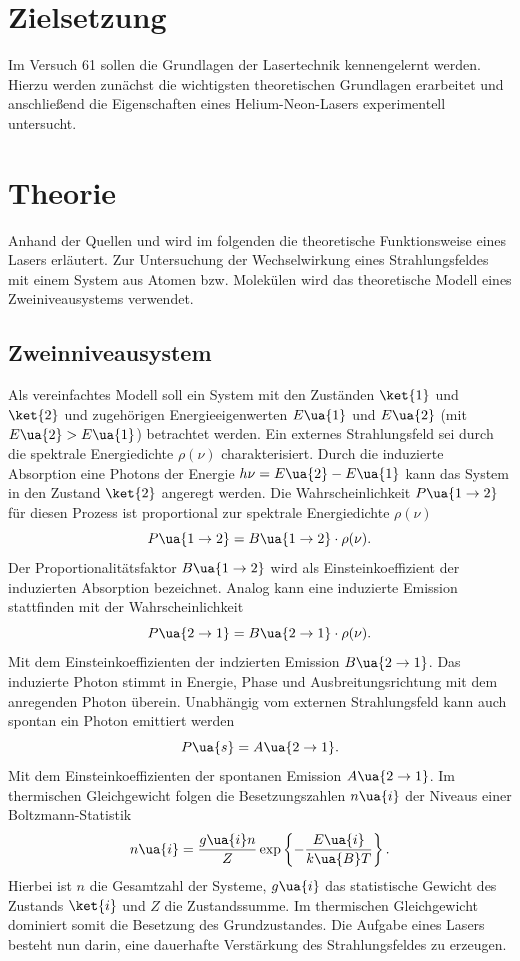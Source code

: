 \setcounter{page}{1}
\section*{Zielsetzung}
Im Versuch 61 sollen die Grundlagen der Lasertechnik kennengelernt werden. Hierzu werden zunächst die
wichtigsten theoretischen Grundlagen erarbeitet und anschließend die Eigenschaften eines Helium-Neon-Lasers
experimentell untersucht.
\section{Theorie}
Anhand der Quellen \cite{anleitung61} und \cite{dem} wird im folgenden die theoretische Funktionsweise eines Lasers
erläutert. Zur Untersuchung der Wechselwirkung eines Strahlungsfeldes mit einem System aus Atomen bzw. Molekülen
wird das theoretische Modell eines Zweiniveausystems verwendet.
\subsection{Zweinniveausystem}
Als vereinfachtes Modell soll ein System mit den Zuständen $\ket{1}$ und $\ket{2}$ und zugehörigen Energieeigenwerten
$E\ua{1}$ und $E\ua{2}$ (mit $E\ua{2}> E\ua{1}$) betrachtet werden. Ein externes Strahlungsfeld sei durch die spektrale Energiedichte $\rho(\nu)$
charakterisiert. Durch die induzierte Absorption eine Photons der Energie $h \nu = E\ua{2} - E\ua{1}$ kann das
System in den Zustand $\ket{2}$ angeregt werden. Die Wahrscheinlichkeit $P\ua{1\rightarrow 2}$ für diesen Prozess ist proportional
zur spektrale Energiedichte $\rho(\nu)$
\begin{equation}
  P\ua{1\rightarrow 2} = B\ua{1\rightarrow 2}\cdot\rho(\nu).
\end{equation}
Der Proportionalitätsfaktor $B\ua{1\rightarrow 2}$ wird als Einsteinkoeffizient der induzierten Absorption bezeichnet. Analog kann
eine induzierte Emission stattfinden mit der Wahrscheinlichkeit
\begin{equation}
  P\ua{2\rightarrow 1} = B\ua{2\rightarrow 1}\cdot\rho(\nu).
\end{equation}
Mit dem Einsteinkoeffizienten der indzierten Emission $B\ua{2\rightarrow1}$.
Das induzierte Photon stimmt in Energie, Phase und Ausbreitungsrichtung mit dem anregenden Photon überein.
Unabhängig vom externen Strahlungsfeld
kann auch spontan ein Photon emittiert werden
\begin{equation}
  P\ua{s} = A\ua{2 \rightarrow 1}.
\end{equation}
Mit dem Einsteinkoeffizienten der spontanen Emission $A\ua{2 \rightarrow 1}$. Im thermischen Gleichgewicht folgen die Besetzungszahlen
$n\ua{i}$ der Niveaus einer Boltzmann-Statistik
\begin{equation}
  n\ua{i} = \frac{g\ua{i}n}{Z}\exp\left\{-\frac{E\ua{i}}{k\ua{B}T}\right\}.
\end{equation}
Hierbei ist $n$ die Gesamtzahl der Systeme, $g\ua{i}$ das statistische Gewicht des Zustands $\ket{i}$ und $Z$ die Zustandssumme. Im thermischen
Gleichgewicht dominiert somit die Besetzung des Grundzustandes. Die Aufgabe eines Lasers besteht nun darin,
eine dauerhafte Verstärkung des Strahlungsfeldes zu erzeugen.

